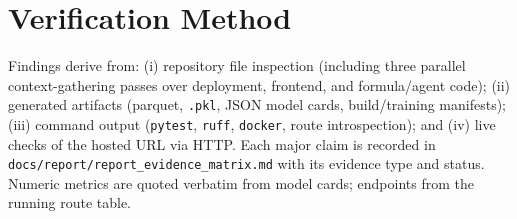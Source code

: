 \documentclass[11pt,a4paper]{article}
\newcommand{\code}[1]{\texttt{\small #1}}
\begin{document}
\section{Verification Method}
Findings derive from: (i) repository file inspection (including three parallel
context-gathering passes over deployment, frontend, and formula/agent code); (ii) generated
artifacts (parquet, \code{.pkl}, JSON model cards, build/training manifests); (iii) command
output (\code{pytest}, \code{ruff}, \code{docker}, route introspection); and (iv) live
checks of the hosted URL via HTTP. Each major claim is recorded in
\code{docs/report/report\_evidence\_matrix.md} with its evidence type and status. Numeric
metrics are quoted verbatim from model cards; endpoints from the running route table.

\end{document}
